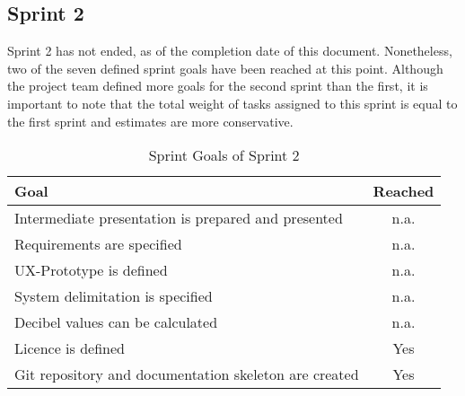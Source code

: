 \subsection{Sprint 2}
Sprint 2 has not ended, as of the completion date of this document. Nonetheless, two of the seven defined sprint goals have been reached at this point.
Although the project team defined more goals for the second sprint than the first, it is important to note that the total weight of tasks assigned to this
sprint is equal to the first sprint and estimates are more conservative.
\begin{table}[H]
    \centering
    \begin{tabularx}{\textwidth}{X c}
        \toprule
        \textbf{Goal}                                         & \textbf{Reached} \\
        \midrule
        Intermediate presentation is prepared and presented   & n.a.             \\
        \midrule
        Requirements are specified                            & n.a.             \\
        \midrule
        UX-Prototype is defined                               & n.a.             \\
        \midrule
        System delimitation is specified                      & n.a.             \\
        \midrule
        Decibel values can be calculated                      & n.a.             \\
        \midrule
        Licence is defined                                    & Yes              \\
        \midrule
        Git repository and documentation skeleton are created & Yes              \\
        \bottomrule
    \end{tabularx}
    \caption{Sprint Goals of Sprint 2}\label{table:sprint_goals2}
\end{table}